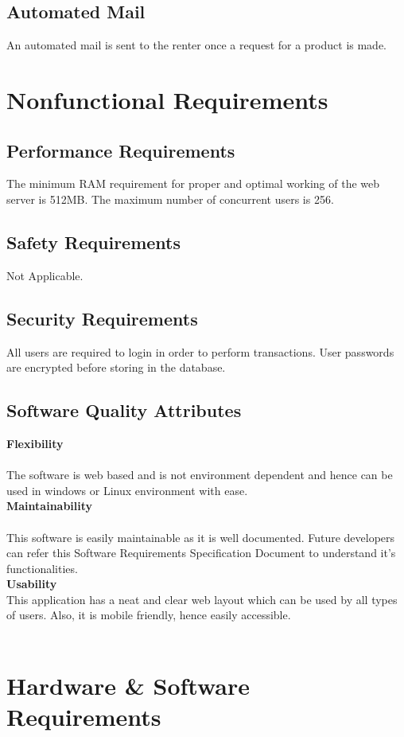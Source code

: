 \documentclass[11pt]{report}
\begin{document}
\subsection{Automated Mail}
An automated mail is sent to the renter  once a request for a product is made.
\section{Nonfunctional Requirements}

\subsection{Performance Requirements}
The minimum RAM requirement for proper and optimal working of the web server is 512MB. The 
maximum number of concurrent users is 256.
\subsection{Safety Requirements}
Not Applicable.
\subsection{Security Requirements}
All users are required to login in order to perform transactions. User passwords are encrypted before storing 
in the database. 
\subsection{Software Quality Attributes}
	\textbf{Flexibility}\\\\
The software is web based and is not environment dependent and hence  can be used in windows or Linux 
environment with ease.\\

\textbf{Maintainability}\\\\
This software is easily maintainable as it is well documented. Future developers can refer this Software 
Requirements Specification Document to understand it's functionalities.\\

\textbf{Usability}\\
This application has a neat and clear web layout which can be used by all types of users. Also, it is mobile­
friendly, hence easily accessible.\\\\
\section{Hardware \& Software Requirements}
\end{document}
